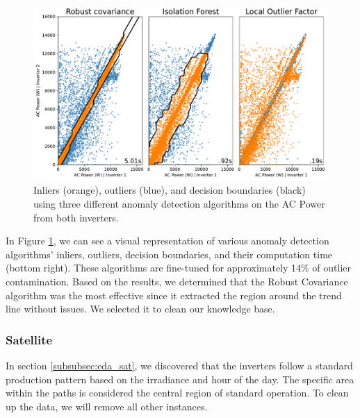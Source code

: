 \begin{figure}[h!]
    \centering
    \includegraphics[width=\textwidth]{figures/chapter5/cleaning/20_cleaning_power.pdf}
    \caption{Inliers (orange), outliers (blue), and decision boundaries (black) using three different anomaly detection algorithms on the AC Power from both inverters.}
    \label{fig:clean_power}
\end{figure}

In Figure \ref{fig:clean_power}, we can see a visual representation of various anomaly detection algorithms' inliers, outliers, decision boundaries, and their computation time (bottom right). These algorithms are fine-tuned for approximately 14\% of outlier contamination. Based on the results, we determined that the Robust Covariance algorithm was the most effective since it extracted the region around the trend line without issues. We selected it to clean our knowledge base.

\subsubsection{Satellite}

In section \ref{subsubsec:eda_sat}, we discovered that the inverters follow a standard production pattern based on the irradiance and hour of the day. The specific area within the paths is considered the central region of standard operation. To clean up the data, we will remove all other instances.

